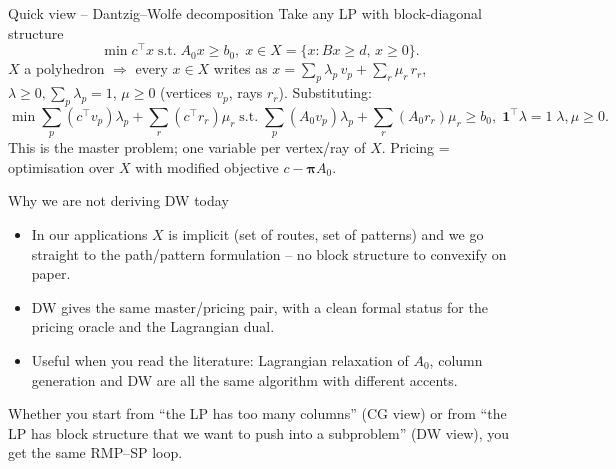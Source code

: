\documentclass[10pt,aspectratio=169]{beamer}
\newcommand{\transpose}{^{\!\top}}
\begin{document}
\begin{frame}{Quick view -- Dantzig--Wolfe decomposition}
  Take any LP with block-diagonal structure
  \[
    \min c\transpose x \;\text{s.t.}\; A_0 x \ge b_0,\; x\in X = \{x:Bx\ge d,\,x\ge 0\}.
  \]
  $X$ a polyhedron $\Rightarrow$ every $x\in X$ writes as
  $x=\sum_p \lambda_p\, v_p + \sum_r \mu_r\, r_r$, $\lambda\geq 0, \sum_p \lambda_p = 1$, $\mu\ge 0$
  (vertices $v_p$, rays $r_r$). Substituting:
  \[
    \min \sum_p (c\transpose v_p)\lambda_p + \sum_r (c\transpose r_r)\mu_r
    \;\text{s.t.}\;
    \sum_p (A_0 v_p)\lambda_p+\sum_r (A_0 r_r)\mu_r\ge b_0,\;
    \mathbf 1\transpose\lambda=1\;
    \lambda, \mu\ge 0.
  \]
  This is the \alert{master problem}; one variable per vertex/ray of $X$.
  Pricing = optimisation over $X$ with modified objective $c-\boldsymbol\pi A_0$.
\end{frame}

\begin{frame}{Why we are not deriving DW today}
  \begin{itemize}\small
    \item In our applications $X$ is implicit (set of routes, set of patterns)
          and we go straight to the path/pattern formulation -- no block
          structure to convexify on paper.
    \item DW gives the same master/pricing pair, with a clean formal status
          for the pricing oracle and the Lagrangian dual.
    \item Useful when you read the literature: Lagrangian relaxation of $A_0$,
          column generation and DW are all the same algorithm with different
          accents.
  \end{itemize}
  \vspace{0.5em}
  \begin{keybox}
    Whether you start from ``the LP has too many columns'' (CG view) or
    from ``the LP has block structure that we want to push into a subproblem''
    (DW view), you get the same RMP--SP loop.
  \end{keybox}
\end{frame}
\end{document}

